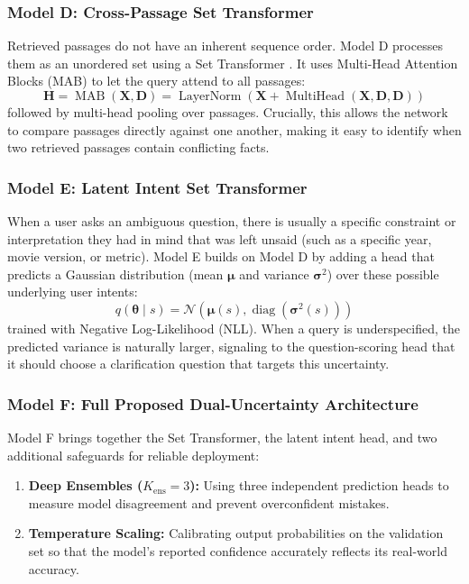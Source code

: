 \subsubsection{Model D: Cross-Passage Set Transformer}
Retrieved passages do not have an inherent sequence order. Model D processes them as an unordered set using a Set Transformer \cite{lee2019set}. It uses Multi-Head Attention Blocks (MAB) to let the query attend to all passages:
\begin{equation}
    \bm{H} = \operatorname{MAB}(\bm{X}, \bm{D}) = \operatorname{LayerNorm}(\bm{X} + \operatorname{MultiHead}(\bm{X}, \bm{D}, \bm{D})) \tag{D}
\end{equation}
followed by multi-head pooling over passages. Crucially, this allows the network to compare passages directly against one another, making it easy to identify when two retrieved passages contain conflicting facts.

\subsubsection{Model E: Latent Intent Set Transformer}
When a user asks an ambiguous question, there is usually a specific constraint or interpretation they had in mind that was left unsaid (such as a specific year, movie version, or metric). Model E builds on Model D by adding a head that predicts a Gaussian distribution (mean $\bm{\mu}$ and variance $\bm{\sigma}^2$) over these possible underlying user intents:
\begin{equation*}
    q(\bm{\theta} \mid s) = \mathcal{N}(\bm{\mu}(s), \operatorname{diag}(\bm{\sigma}^2(s)))
\end{equation*}
trained with Negative Log-Likelihood (NLL). When a query is underspecified, the predicted variance is naturally larger, signaling to the question-scoring head that it should choose a clarification question that targets this uncertainty.

\subsubsection{Model F: Full Proposed Dual-Uncertainty Architecture}
Model F brings together the Set Transformer, the latent intent head, and two additional safeguards for reliable deployment:
\begin{enumerate}
    \item \textbf{Deep Ensembles ($K_{\text{ens}}=3$):} Using three independent prediction heads \cite{lakshminarayanan2017simple} to measure model disagreement and prevent overconfident mistakes.
    \item \textbf{Temperature Scaling:} Calibrating output probabilities on the validation set \cite{guo2017calibration} so that the model's reported confidence accurately reflects its real-world accuracy.
\end{enumerate}

